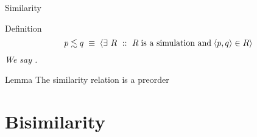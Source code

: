 \documentclass{beamer}
\begin{document}
\begin{slide}{Similarity}
\small

\begin{block}{Definition}
\centering
\[p \lesssim q\; \equiv\; \rcb{\exists}{R}{}{R\; \text{is a simulation and}\; \pair{p,q} \in R} 
\]
\emph{We say .}
\end{block}
\begin{block}{Lemma}
The similarity relation is a preorder\\
\end{block}
\end{slide}


\section{Bisimilarity}
\end{document}
